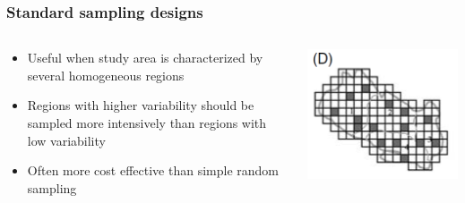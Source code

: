 \documentclass[color=usenames,dvipsnames]{beamer}\usepackage[]{graphicx}\usepackage[]{color}
\begin{document}
\begin{frame}
  \frametitle{Standard sampling designs}
  \large
  {\centering \bf \Large \color{RoyalBlue}{Stratified random sampling} \par}
  \vfill
  \begin{columns}
    \large
    \begin{column}{0.6\textwidth}
      \begin{itemize}[<+->]
        \item Useful when study area is characterized by several
          homogeneous regions
        \item Regions with higher variability should be sampled more
          intensively than regions with low variability
        \item Often more cost effective than simple random sampling
      \end{itemize}
    \end{column}
    \begin{column}{0.4\textwidth}
      \includegraphics[width=\textwidth]{figs/designD}
    \end{column}
  \end{columns}
\end{frame}



\end{document}
